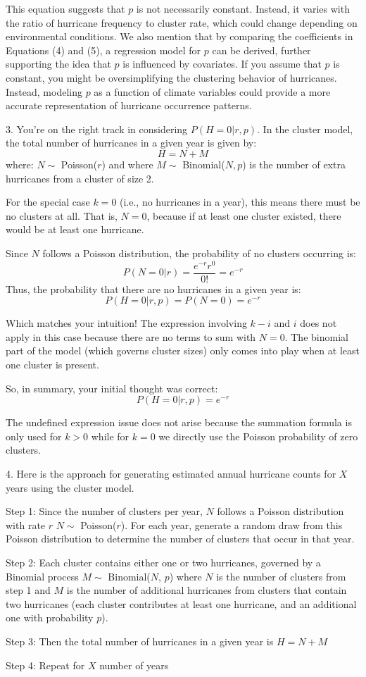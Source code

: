 \documentclass[
]{article}
\begin{document}
This equation suggests that \(p\) is not necessarily constant. Instead,
it varies with the ratio of hurricane frequency to cluster rate, which
could change depending on environmental conditions. We also mention that
by comparing the coefficients in Equations (4) and (5), a regression
model for \(p\) can be derived, further supporting the idea that \(p\)
is influenced by covariates. If you assume that \(p\) is constant, you
might be oversimplifying the clustering behavior of hurricanes. Instead,
modeling \(p\) as a function of climate variables could provide a more
accurate representation of hurricane occurrence patterns.

3. You're on the right track in considering \(P(H=0|r,p)\). In the
cluster model, the total number of hurricanes in a given year is given
by: \[
H = N + M
\] where: \(N \sim\) Poisson(\(r\)) and where \(M \sim\)
Binomial(\(N, p\)) is the number of extra hurricanes from a cluster of
size 2.

For the special case \(k=0\) (i.e., no hurricanes in a year), this means
there must be no clusters at all. That is, \(N = 0\), because if at
least one cluster existed, there would be at least one hurricane.

Since \(N\) follows a Poisson distribution, the probability of no
clusters occurring is: \[
P(N=0|r) = \frac{e^{-r} r^0}{0!} = e^{-r}
\] Thus, the probability that there are no hurricanes in a given year
is: \[
P(H=0|r,p) = P(N=0) = e^{-r}
\]

Which matches your intuition! The expression involving \(k-i\) and \(i\)
does not apply in this case because there are no terms to sum with
\(N=0\). The binomial part of the model (which governs cluster sizes)
only comes into play when at least one cluster is present.

So, in summary, your initial thought was correct: \[
P(H=0|r, p) = e^{-r}
\]

The undefined expression issue does not arise because the summation
formula is only used for \(k \gt 0\) while for \(k=0\) we directly use
the Poisson probability of zero clusters.

4. Here is the approach for generating estimated annual hurricane counts
for \(X\) years using the cluster model.

Step 1: Since the number of clusters per year, \(N\) follows a Poisson
distribution with rate \(r\) \(N \sim\) Poisson(\(r\)). For each year,
generate a random draw from this Poisson distribution to determine the
number of clusters that occur in that year.

Step 2: Each cluster contains either one or two hurricanes, governed by
a Binomial process \(M \sim\) Binomial(\(N\), \(p\)) where \(N\) is the
number of clusters from step 1 and \(M\) is the number of additional
hurricanes from clusters that contain two hurricanes (each cluster
contributes at least one hurricane, and an additional one with
probability \(p\)).

Step 3: Then the total number of hurricanes in a given year is
\(H = N + M\)

Step 4: Repeat for \(X\) number of years
\end{document}
